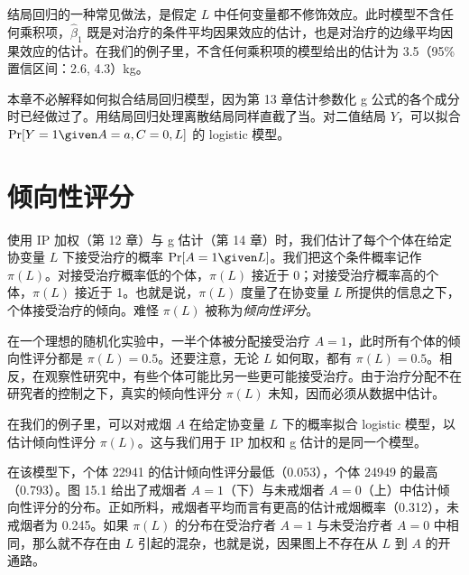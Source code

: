 结局回归的一种常见做法，是假定 $L$ 中任何变量都不修饰效应。此时模型不含任何乘积项，$\hat\beta_1$ 既是对治疗的条件平均因果效应的估计，也是对治疗的边缘平均因果效应的估计。在我们的例子里，不含任何乘积项的模型给出的估计为 3.5（95\% 置信区间：2.6, 4.3）kg。

本章不必解释如何拟合结局回归模型，因为第 13 章估计参数化 g 公式的各个成分时已经做过了。用结局回归处理离散结局同样直截了当。对二值结局 $Y$，可以拟合 $\Pr[Y=1\given A=a,C=0,L]$ 的 logistic 模型。

\section{倾向性评分}

使用 IP 加权（第 12 章）与 g 估计（第 14 章）时，我们估计了每个个体在给定协变量 $L$ 下接受治疗的概率 $\Pr[A=1\given L]$。我们把这个条件概率记作 $\pi(L)$。对接受治疗概率低的个体，$\pi(L)$ 接近于 0；对接受治疗概率高的个体，$\pi(L)$ 接近于 1。也就是说，$\pi(L)$ 度量了在协变量 $L$ 所提供的信息之下，个体接受治疗的倾向。难怪 $\pi(L)$ 被称为\emph{倾向性评分}。

在一个理想的随机化实验中，一半个体被分配接受治疗 $A=1$，此时所有个体的倾向性评分都是 $\pi(L)=0.5$。还要注意，无论 $L$ 如何取，都有 $\pi(L)=0.5$。相反，在观察性研究中，有些个体可能比另一些更可能接受治疗。由于治疗分配不在研究者的控制之下，真实的倾向性评分 $\pi(L)$ 未知，因而必须从数据中估计。

在我们的例子里，可以对戒烟 $A$ 在给定协变量 $L$ 下的概率拟合 logistic 模型，以估计倾向性评分 $\pi(L)$。这与我们用于 IP 加权和 g 估计的是同一个模型。

在该模型下，个体 22941 的估计倾向性评分最低（0.053），个体 24949 的最高（0.793）。图 15.1 给出了戒烟者 $A=1$（下）与未戒烟者 $A=0$（上）中估计倾向性评分的分布。正如所料，戒烟者平均而言有更高的估计戒烟概率（0.312），未戒烟者为 0.245。如果 $\pi(L)$ 的分布在受治疗者 $A=1$ 与未受治疗者 $A=0$ 中相同，那么就不存在由 $L$ 引起的混杂，也就是说，因果图上不存在从 $L$ 到 $A$ 的开通路。

